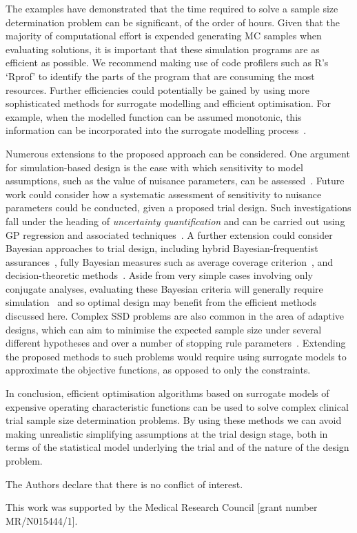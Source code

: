 \documentclass[sagev, doublespace, Crown]{sagej}
\begin{document}
The examples have demonstrated that the time required to solve a sample size determination problem can be significant, of the order of hours. Given that the majority of computational effort is expended generating MC samples when evaluating solutions, it is important that these simulation programs are as efficient as possible. We recommend making use of code profilers such as R's `Rprof' to identify the parts of the program that are consuming the most resources. Further efficiencies could potentially be gained by using more sophisticated methods for surrogate modelling and efficient optimisation. For example, when the modelled function can be assumed monotonic, this information can be incorporated into the surrogate modelling process~\cite{Emmerich2011}.

Numerous extensions to the proposed approach can be considered. One argument for simulation-based design is the ease with which sensitivity to model assumptions, such as the value of nuisance parameters, can be assessed~\cite{Landau2013}. Future work could consider how a systematic assessment of sensitivity to nuisance parameters could be conducted, given a proposed trial design. Such investigations fall under the heading of \emph{uncertainty quantification} and can be carried out using GP regression and associated techniques~\cite{Kennedy2001}. A further extension could consider Bayesian approaches to trial design, including hybrid Bayesian-frequentist assurances~\cite{OHagan2005}, fully Bayesian measures such as average coverage criterion~\cite{Cao2009}, and decision-theoretic methods~\cite{Oakley2010}. Aside from very simple cases involving only conjugate analyses, evaluating these Bayesian criteria will generally require simulation~\cite{OHagan2005} and so optimal design may benefit from the efficient methods discussed here. Complex SSD problems are also common in the area of adaptive designs, which can aim to minimise the expected sample size under several different hypotheses and over a number of stopping rule parameters~\cite{Wason2012}.  Extending the proposed methods to such problems would require using surrogate models to approximate the objective functions, as opposed to only the constraints.

In conclusion, efficient optimisation algorithms based on surrogate models of expensive operating characteristic functions can be used to solve complex clinical trial sample size determination problems. By using these methods we can avoid making unrealistic simplifying assumptions at the trial design stage, both in terms of the statistical model underlying the trial and of the nature of the design problem.

\begin{dci}
The Authors declare that there is no conflict of interest.
\end{dci}

\begin{funding}
This work was supported by the Medical Research Council [grant number MR/N015444/1].
\end{funding}



\end{document}
